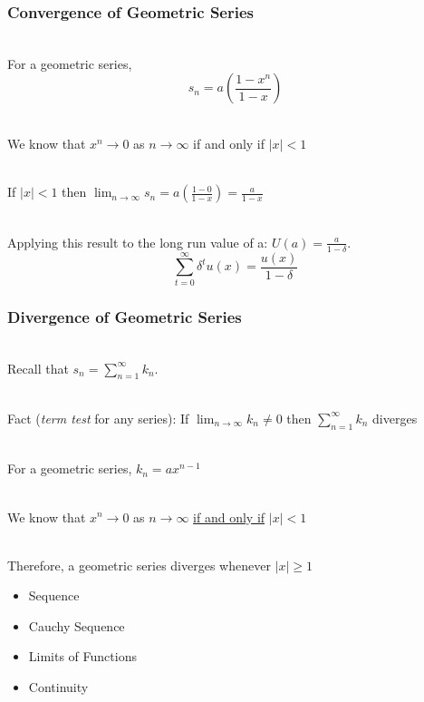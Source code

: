 \documentclass[handout]{beamer}
\numberwithin{equation}{section}
\begin{document}
\begin{frame}
\frametitle{Convergence of Geometric Series}

\ \\For a geometric series, $$s_n=a\left(\frac{1-x^n}{1-x}\right)$$ \pause

\ \\We know that $x^n\rightarrow 0$ as $n\rightarrow\infty$ if and only if $|x|<1$ \pause

\ \\If $|x|<1$ then $\lim_{n\rightarrow\infty}s_n = a\left({\frac{1-0}{1-x}}\right) = {\frac{a}{1-x}}$\pause

\ \\ Applying this result to the long run value of a: $U(a)= \frac{a}{1-\delta}$.
$$\sum_{t=0}^\infty \delta^t u(x) = {\frac{u(x)}{1 - \delta}}$$

\end{frame}



\begin{frame}
\frametitle{Divergence of Geometric Series}

\ \\Recall that $s_{n} = \sum_{n = 1}^{\infty} k_{n}$. \pause

\ \\Fact (\textit{term test} for any series): If $\lim_{n\rightarrow \infty} k_n\not=0$ then $\sum_{n=1}^\infty k_n$ diverges \pause

\ \\For a geometric series, $k_n=ax^{n-1}$ \pause

\ \\We know that $x^n\rightarrow 0$ as $n\rightarrow\infty$ \underline{if and only if} $|x|<1$ \pause

\ \\Therefore, a geometric series diverges whenever $|x|\geq 1$

\end{frame}




\begin{frame}

\begin{itemize}
\item \textcolor{mygray}{Sequence}
 
\item \textcolor{mygray}{Cauchy Sequence}
\item \textcolor{myblack}{Limits of Functions}
\item \textcolor{mygray}{Continuity}
\end{itemize}

\end{frame}
\end{document}
